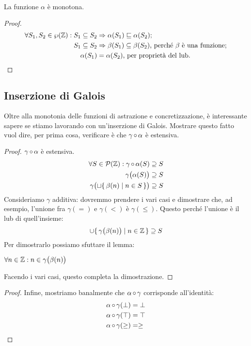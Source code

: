 \begin{proposizione}
La funzione $\alpha$ è monotona.
\end{proposizione}
\begin{proof}
        \begin{align*}
                \forall S_1, S_2 \in \wp(\mathbb{Z}) \mathrel{:} S_1 \subseteq S_2 &\Rightarrow \alpha(S_1) \sqsubseteq \alpha(S_2)\text{;} \\
                S_1 \subseteq S_2 &\Rightarrow \beta(S_1) \subseteq \beta(S_2) \text{, perché } \beta \text{ è  una funzione;} \\
                \alpha(S_1) &= \alpha(S_2) \text{, per proprietà del lub.}
        \end{align*}
\end{proof}

\subsection{Inserzione di Galois}

Oltre alla monotonia delle funzioni di astrazione e concretizzazione,
è interessante sapere se stiamo lavorando con un'inserzione di Galois.
Mostrare questo fatto vuol dire, per prima cosa,
verificare è che $\mathrm{\gamma}\mathop{\circ}\mathrm{\alpha}$ è estensiva. 

\begin{proof}
$\mathrm{\gamma}\mathop{\circ}\mathrm{\alpha}$ è estensiva.
\begin{align*}
        \forall S \in \mathcal{P}(\mathbb{Z}) \mathrel{:} \mathrm{\gamma}\mathop{\circ}\mathrm{\alpha}(S) &\supseteq S \\
        \gamma\bigl(\alpha(S)\bigr) &\supseteq S \\
        \gamma\bigl(\sqcup \{\, \beta(n) \mid n \in S \,\} \bigr) &\supseteq S
\end{align*}
Consideriamo $\gamma$ additiva: dovremmo prendere i vari casi e
dimostrare che, ad esempio, l'unione fra
$\gamma(=)$ e $\gamma(<)$ è $\gamma(\leq)$.
Questo perché l'unione è il lub di quell'insieme:
\[
        \cup \{\, \gamma\bigl(\beta(n)\bigr) \mid n \in \mathbb{Z} \,\} \supseteq S
\]
Per dimostrarlo possiamo sfuttare il lemma:
\begin{lemma}
        $ \forall n \in \mathbb{Z} \mathrel{:} n \in \gamma\bigl(\beta(n)\bigr) $
\end{lemma}
Facendo i vari casi, questo completa la dimostrazione.
\end{proof}

\begin{proof}
Infine, mostriamo banalmente che $\mathrm{\alpha}\mathop{\circ}\mathrm{\gamma}$ corrisponde all'identità:
\begin{align*}
        \mathrm{\alpha}\mathop{\circ}\mathrm{\gamma}(\bot) &= \bot \\
        \mathrm{\alpha}\mathop{\circ}\mathrm{\gamma}(\top) &= \top \\
        \mathrm{\alpha}\mathop{\circ}\mathrm{\gamma}(\geq) &= \geq
\end{align*}
\end{proof}

